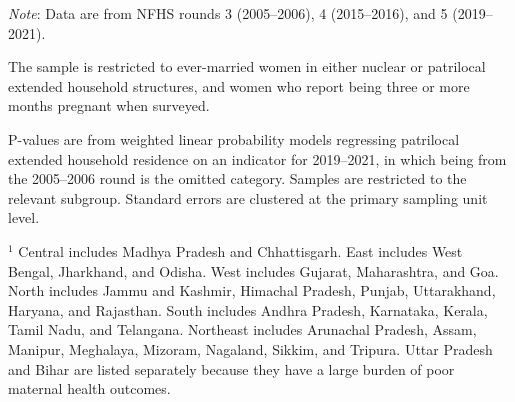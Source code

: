 \documentclass[12pt]{article}
\begin{document}
\begin{scriptsize}
\setlength{\tabcolsep}{6pt}
\renewcommand{\arraystretch}{1.2}

\label{tab:patrilocal_subgroups}

\vspace{-4pt}

\begingroup

\setlength\LTleft{\fill}
\setlength\LTright{\fill}

\let\tabular\longtable
\let\endtabular\endlongtable


\addtocounter{table}{-1}

\endgroup

\vspace{1ex}

\textsf{\textit{Note}: Data are from NFHS rounds 3 (2005--2006),
4 (2015--2016), and 5 (2019--2021).}

\textsf{The sample is restricted to ever-married women in either nuclear
or patrilocal extended household structures, and women who report being
three or more months pregnant when surveyed.}

\textsf{P-values are from weighted linear probability models regressing
patrilocal extended household residence on an indicator for 2019--2021,
in which being from the 2005--2006 round is the omitted category.
Samples are restricted to the relevant subgroup. Standard errors are
clustered at the primary sampling unit level.}

\textsf{$^1$ Central includes Madhya Pradesh and Chhattisgarh. East
includes West Bengal, Jharkhand, and Odisha. West includes Gujarat,
Maharashtra, and Goa. North includes Jammu and Kashmir, Himachal Pradesh,
Punjab, Uttarakhand, Haryana, and Rajasthan. South includes Andhra Pradesh,
Karnataka, Kerala, Tamil Nadu, and Telangana. Northeast includes Arunachal
Pradesh, Assam, Manipur, Meghalaya, Mizoram, Nagaland, Sikkim, and Tripura.
Uttar Pradesh and Bihar are listed separately because they have a large
burden of poor maternal health outcomes.}

\end{scriptsize}

\vspace{1.5\baselineskip}
\end{document}
